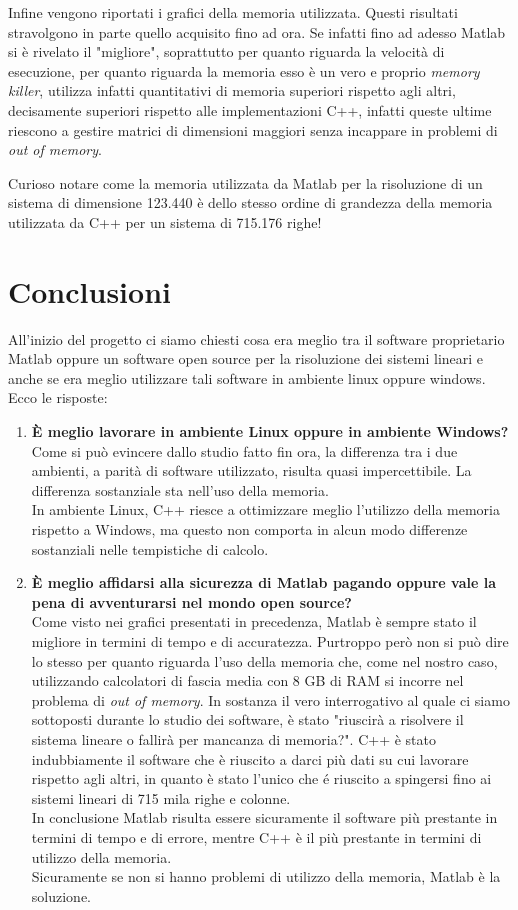 \documentclass[preprint,12pt]{elsarticle}
\begin{document}
Infine vengono riportati i grafici della memoria utilizzata. Questi risultati stravolgono in parte quello acquisito fino ad ora.
Se infatti fino ad adesso Matlab si è rivelato il "migliore", soprattutto per quanto riguarda la velocità di esecuzione, per quanto riguarda la memoria esso è un vero e proprio \textit{memory killer}, utilizza infatti quantitativi di memoria superiori rispetto agli altri, decisamente superiori rispetto alle implementazioni C++, infatti queste ultime riescono a gestire matrici di dimensioni maggiori senza incappare in problemi di \textit{out of memory}.

Curioso notare come la memoria utilizzata da Matlab per la risoluzione di un sistema di dimensione 123.440 è dello stesso ordine di grandezza della memoria utilizzata da C++ per un sistema di 715.176 righe!

\section*{Conclusioni}
All'inizio del progetto ci siamo chiesti cosa era meglio tra il software proprietario Matlab oppure un software open source per la risoluzione dei sistemi lineari e anche se era meglio utilizzare tali software in ambiente linux oppure windows. Ecco le risposte:

\begin{enumerate}
\item \textbf{\`E meglio lavorare in ambiente Linux oppure in ambiente Windows?}\\
Come si può evincere dallo studio fatto fin ora, la differenza tra i due ambienti, a parità di software utilizzato, risulta quasi impercettibile. La differenza sostanziale sta nell'uso della memoria.\\
In ambiente Linux, C++ riesce a ottimizzare meglio l'utilizzo della memoria rispetto a Windows, ma questo non comporta in alcun modo differenze sostanziali nelle tempistiche di calcolo.

\item \textbf{\`E meglio affidarsi alla sicurezza di Matlab pagando oppure vale la pena
di avventurarsi nel mondo open source?}\\
Come visto nei grafici presentati in precedenza, Matlab è sempre stato il migliore in termini di tempo e di accuratezza. Purtroppo però non si può dire lo stesso per quanto riguarda l'uso della memoria che, come nel nostro caso, utilizzando calcolatori di fascia media con 8 GB di RAM si incorre nel problema di \textit{out of memory}. In sostanza il vero interrogativo al quale ci siamo sottoposti durante lo studio dei software, è stato "riuscirà a risolvere il sistema lineare o fallirà per mancanza di memoria?". C++ è stato indubbiamente il software che è riuscito a darci più dati su cui lavorare rispetto agli altri, in quanto è stato l'unico che é riuscito a spingersi fino ai sistemi lineari di 715 mila righe e colonne.\\
In conclusione Matlab risulta essere sicuramente il software più prestante in termini di tempo e di errore, mentre C++ è il più prestante in termini di utilizzo della memoria.\\
Sicuramente se non si hanno problemi di utilizzo della memoria, Matlab è la soluzione.
\end{enumerate}
 
\end{document}
